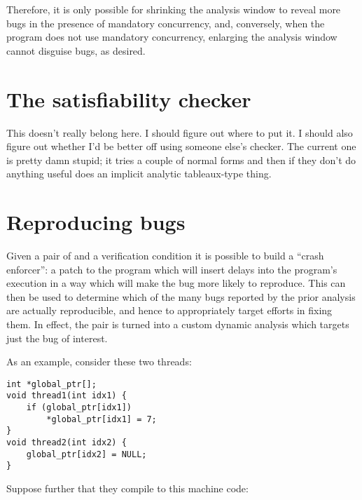 Therefore, it is only possible for shrinking the analysis window to
reveal more bugs in the presence of mandatory concurrency, and,
conversely, when the program does not use mandatory concurrency,
enlarging the analysis window cannot disguise bugs, as desired.


\section{The satisfiability checker}
This doesn't really belong here.  I should figure out where to put it.
I should also figure out whether I'd be better off using someone
else's checker.  The current one is pretty damn stupid; it tries a
couple of normal forms and then if they don't do anything useful does
an implicit analytic tableaux-type thing.

\section{Reproducing bugs}
\label{sect:reproducing_bugs}


Given a pair of {\StateMachines} and a verification condition it is
possible to build a ``crash enforcer'': a patch to the program which
will insert delays into the program's execution in a way which will
make the bug more likely to reproduce.  This can then be used to
determine which of the many bugs reported by the prior analysis are
actually reproducible, and hence to appropriately target efforts in
fixing them.  In effect, the {\StateMachine} pair is turned into a
custom dynamic analysis which targets just the bug of interest.

As an example, consider these two threads:

\begin{verbatim}
int *global_ptr[];
void thread1(int idx1) {
    if (global_ptr[idx1])
        *global_ptr[idx1] = 7;
} 
void thread2(int idx2) {
    global_ptr[idx2] = NULL;
}
\end{verbatim}

Suppose further that they compile to this machine code:

